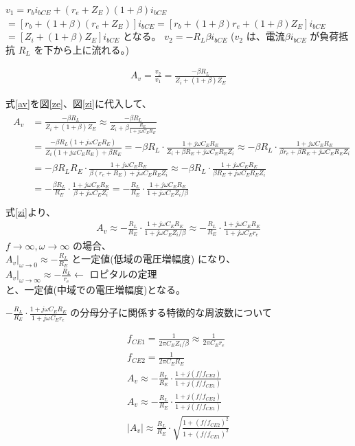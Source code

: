 $v_1 = r_b i_{bCE}+(r_e+Z_E)(1+\beta)i_{bCE}$
$= [r_b+(1+\beta)(r_e+Z_E)]i_{bCE} = [r_b+(1+\beta)r_e+(1+\beta)Z_E]i_{bCE}$
$= [Z_i+(1+\beta)Z_E]i_{bCE}$ となる。
$v_2 = -R_L\beta i_{bCE}$ ($v_2$ は、電流$\beta i_{bCE}$ が負荷抵抗 $R_L$ を下から上に流れる。)

\begin{align}
  A_v = \frac{v_2}{v_1} =\frac{-\beta R_L}{Z_i+(1+\beta)Z_E} \label{av}  
\end{align}

式\eqref{av}を図\eqref{ze}、図\eqref{zi}に代入して、
\begin{align}
  \begin{aligned}
  A_v & = \frac{-\beta R_L}{Z_i+(1+\beta)Z_E} \approx \frac{-\beta R_L}{Z_i+\beta \frac{R_E}{1+j\omega C_E R_E}}\\
  & = \frac{-\beta R_L(1+j\omega C_E R_E)}{Z_i(1+j\omega C_ER_E)+\beta R_E} = -\beta R_L \cdot \frac{1+j\omega C_E R_E}{Z_i+\beta R_E+j\omega C_ER_EZ_i} \approx -\beta R_L \cdot \frac{1+j\omega C_E R_E}{\beta r_e+\beta R_E + j\omega C_E R_E Z_i}\\
  & = -\beta R_L R_E \cdot \frac{1+j\omega C_ER_E}{\beta(r_e+R_E)+j\omega C_E R_E Z_i} \approx -\beta R_L \cdot \frac{1+j\omega C_E R_E}{\beta R_E + j\omega C_E R_E Z_i}\\
  & = -\frac{\beta R_L}{R_E} \cdot \frac{1+j\omega C_E R_E}{\beta + j\omega C_E Z_i} = -\frac{R_L}{R_E} \cdot \frac{1+j\omega C_E R_E}{1+j\omega C_E Z_i/\beta} \\ \label{}
  \end{aligned}
\end{align}
式\eqref{zi}より、
\begin{align}
  A_v \approx -\frac{R_L}{R_E}\cdot\frac{1+j\omega C_ER_E}{1+j\omega C_EZ_i/\beta} \approx -\frac{R_L}{R_E}\cdot \frac{1+j\omega C_E R_E}{1+j\omega C_E r_e}
\end{align}
$f \to \infty, \omega \to \infty$ の場合、\\
$\left.A_v\right|_{\omega \to 0} \approx -\frac{R_L}{R_E}$ と一定値(低域の電圧増幅度) になり、\\
$\left.A_v\right|_{\omega \to \infty} \approx -\frac{R_L}{r_e} \leftarrow$ ロピタルの定理\\
と、一定値(中域での電圧増幅度)となる。

$-\frac{R_L}{R_E} \cdot \frac{1+j\omega C_E R_E}{1+j\omega C_E r_e}$ の分母分子に関係する特徴的な周波数について

\begin{align}
  f_{CE1} = \frac{1}{2\pi C_E Z_i/\beta} \approx \frac{1}{2\pi C_E r_e}\\
  f_{CE2} = \frac{1}{2\pi C_E R_E}\\
  A_v \approx -\frac{R_L}{R_E} \cdot \frac{1+j(f/f_{CE2})}{1+j(f/f_{CE1})}\\
  A_v \approx -\frac{R_L}{R_E} \cdot \frac{1+j(f/f_{CE2})}{1+j(f/f_{CE1})}\\
  |A_v| \approx \frac{R_L}{R_E} \cdot \sqrt{\frac{1+(f/f_{CE2})^2}{1+(f/f_{CE1})^2}}
\end{align}


